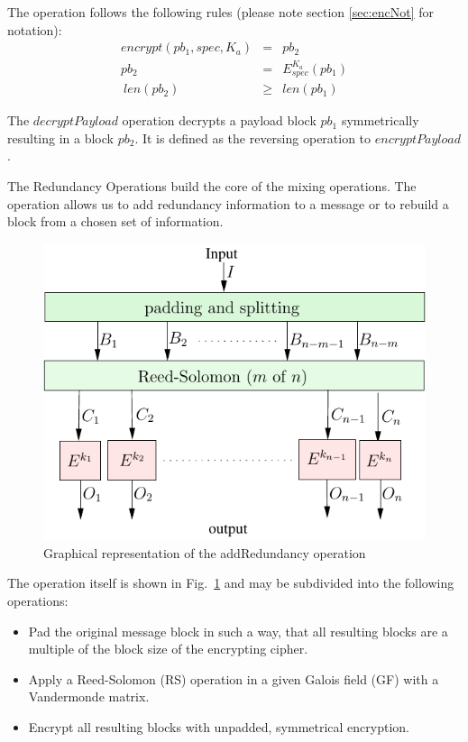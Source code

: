 \documentclass[acmsmall, screen, review]{acmart}
\begin{document}
The operation follows the following rules (please note section \ref{sec:encNot} for notation):
\begin{eqnarray}
encrypt(pb_1, spec, K_a) & = & pb_2 \\
pb_2 & = & E_{spec}^{K_a}\left( pb_1 \right)\\\
len(pb_2) & \geq & len(pb_1)
\end{eqnarray}


The $decryptPayload$ operation decrypts a payload block $pb_1$ symmetrically resulting in a block $pb_2$. It is defined as the reversing operation to $encryptPayload$. 

%
%

The Redundancy Operations build the core of the mixing operations. The operation allows us to add redundancy information to a message or to rebuild a block from a chosen set of information. 

\begin{figure}[ht]\centering
	\includegraphics[width=0.5\columnwidth]{addRedundancyOp}
	\caption{Graphical representation of the addRedundancy operation}
	\label{fig:addRedundancyOperation}
\end{figure}

The operation itself is shown in Fig.~\ref{fig:addRedundancyOperation} and may be subdivided into the following operations:
\begin{itemize}
	\item Pad the original message block in such a way, that all resulting blocks are a multiple of the block size of the encrypting cipher.
	\item Apply a Reed-Solomon (RS) operation in a given Galois field (GF) with a Vandermonde matrix.
	\item Encrypt all resulting blocks with unpadded, symmetrical encryption.
\end{itemize}
\end{document}
